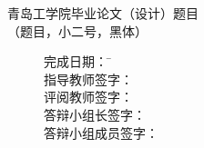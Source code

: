 %
%
\begin{center}
\xiaoerhao\heiti 青岛工学院毕业论文（设计）题目 \\
\xiaosihao\songti（题目，小二号，黑体）
\begin{figure}[!b]
\setlength{\baselineskip}{35pt}
\xiaosanhao
\begin{tabbing}
 \hspace{5cm}完成日期：\hspace{2cm} \= \unline[6cm]{} \\
 \hspace{5cm}指导教师签字： \> \unline[6cm]{} \\
 \hspace{5cm}评阅教师签字： \> \unline[6cm]{} \\
 \hspace{5cm}答辩小组长签字： \> \unline[6cm]{} \\
 \hspace{5cm}答辩小组成员签字： \> \unline[6cm]{} \\ \\
\end{tabbing}
\end{figure}
\end{center}